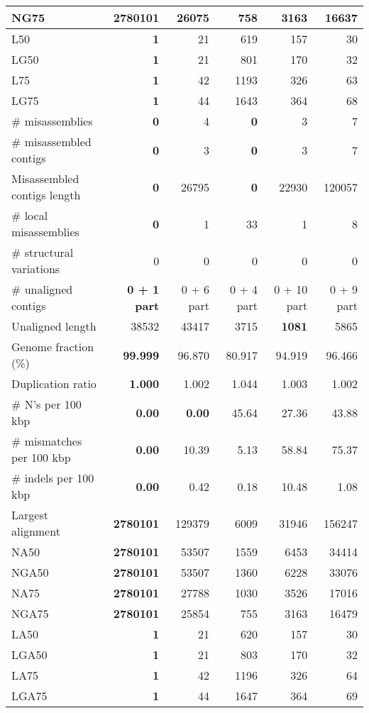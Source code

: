\documentclass[12pt,a4paper]{article}
\begin{document}
\begin{table}[ht]
\begin{center}
\begin{tabular}{|l*{5}{|r}|}
NG75 & {\bf 2780101} & 26075 & 758 & 3163 & 16637 \\ \hline
L50 & {\bf 1} & 21 & 619 & 157 & 30 \\ \hline
LG50 & {\bf 1} & 21 & 801 & 170 & 32 \\ \hline
L75 & {\bf 1} & 42 & 1193 & 326 & 63 \\ \hline
LG75 & {\bf 1} & 44 & 1643 & 364 & 68 \\ \hline
\# misassemblies & {\bf 0} & 4 & {\bf 0} & 3 & 7 \\ \hline
\# misassembled contigs & {\bf 0} & 3 & {\bf 0} & 3 & 7 \\ \hline
Misassembled contigs length & {\bf 0} & 26795 & {\bf 0} & 22930 & 120057 \\ \hline
\# local misassemblies & {\bf 0} & 1 & 33 & 1 & 8 \\ \hline
\# structural variations & 0 & 0 & 0 & 0 & 0 \\ \hline
\# unaligned contigs & {\bf 0 + 1 part} & 0 + 6 part & 0 + 4 part & 0 + 10 part & 0 + 9 part \\ \hline
Unaligned length & 38532 & 43417 & 3715 & {\bf 1081} & 5865 \\ \hline
Genome fraction (\%) & {\bf 99.999} & 96.870 & 80.917 & 94.919 & 96.466 \\ \hline
Duplication ratio & {\bf 1.000} & 1.002 & 1.044 & 1.003 & 1.002 \\ \hline
\# N's per 100 kbp & {\bf 0.00} & {\bf 0.00} & 45.64 & 27.36 & 43.88 \\ \hline
\# mismatches per 100 kbp & {\bf 0.00} & 10.39 & 5.13 & 58.84 & 75.37 \\ \hline
\# indels per 100 kbp & {\bf 0.00} & 0.42 & 0.18 & 10.48 & 1.08 \\ \hline
Largest alignment & {\bf 2780101} & 129379 & 6009 & 31946 & 156247 \\ \hline
NA50 & {\bf 2780101} & 53507 & 1559 & 6453 & 34414 \\ \hline
NGA50 & {\bf 2780101} & 53507 & 1360 & 6228 & 33076 \\ \hline
NA75 & {\bf 2780101} & 27788 & 1030 & 3526 & 17016 \\ \hline
NGA75 & {\bf 2780101} & 25854 & 755 & 3163 & 16479 \\ \hline
LA50 & {\bf 1} & 21 & 620 & 157 & 30 \\ \hline
LGA50 & {\bf 1} & 21 & 803 & 170 & 32 \\ \hline
LA75 & {\bf 1} & 42 & 1196 & 326 & 64 \\ \hline
LGA75 & {\bf 1} & 44 & 1647 & 364 & 69 \\ \hline
\end{tabular}
\end{center}
\end{table}
\end{document}
